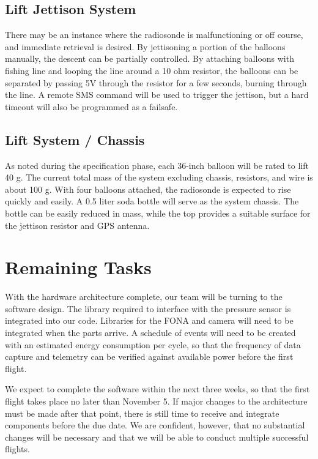 \documentclass[conference,compsoc]{IEEEtran}
\begin{document}
\subsection{Lift Jettison System}
There may be an instance where the radiosonde is malfunctioning or off course, and immediate retrieval is desired.  By jettisoning a portion of the balloons manually, the descent can be partially controlled.  By attaching balloons with fishing line and looping the line around a 10 ohm resistor, the balloons can be separated by passing 5V through the resistor for a few seconds, burning through the line.  A remote SMS command will be used to trigger the jettison, but a hard timeout will also be programmed as a failsafe.

\subsection{Lift System / Chassis}
As noted during the specification phase, each 36-inch balloon will be rated to lift 40 g. The current total mass of the system excluding chassis, resistors, and wire is about 100 g.  With four balloons attached, the radiosonde is expected to rise quickly and easily.  A 0.5 liter soda bottle will serve as the system chassis.  The bottle can be easily reduced in mass, while the top provides a suitable surface for the jettison resistor and GPS antenna.

\section{Remaining Tasks}
With the hardware architecture complete, our team will be turning to the software design.  The library required to interface with the pressure sensor is integrated into our code.  Libraries for the FONA and camera will need to be integrated when the parts arrive.  A schedule of events will need to be created with an estimated energy consumption per cycle, so that the frequency of data capture and telemetry can be verified against available power before the first flight.

We expect to complete the software within the next three weeks, so that the first flight takes place no later than November 5.  If major changes to the architecture must be made after that point, there is still time to receive and integrate components before the due date.  We are confident, however, that no substantial changes will be necessary and that we will be able to conduct multiple successful flights.
\end{document}
